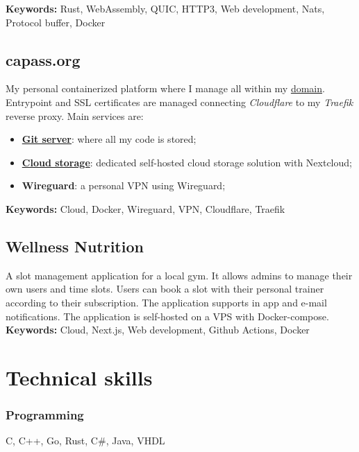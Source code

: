 \documentclass[11pt,a4paper]{article}
\begin{document}
  \textbf{Keywords:} Rust, WebAssembly, QUIC, HTTP3, Web development, Nats, Protocol buffer, Docker 
  
  \subsection{capass.org \href{https://github.com/alarmfox/personal-cloud}{\faGithub} \href{https://git.capass.org}{\faGit} \href{https://cloud.capass.org}{\faCloud}}
  My personal containerized platform where I manage all within my \href{https://capass.org}{domain}. Entrypoint and SSL certificates are managed connecting \textit{Cloudflare} to my \textit{Traefik} reverse proxy. Main services are:
  \begin{itemize}
    \item \href{https://git.capass.org}{\textbf{Git server}}: where all my code is stored;
    \item \href{https://cloud.capass.org}{\textbf{Cloud storage}}: dedicated self-hosted cloud storage solution with Nextcloud;
    \item \textbf{Wireguard}: a personal VPN using Wireguard;
  \end{itemize}
  
  \textbf{Keywords:} Cloud, Docker, Wireguard, VPN, Cloudflare, Traefik

  \subsection{Wellness Nutrition \href{https://github.com/alarmfox/wellness-nutrition}{\faGithub} \href{https://wellnessdemo.capass.org}{\faLaptopCode}}
  A slot management application for a local gym. It allows admins to manage their own users and time slots. Users can book a slot with their personal trainer according to their subscription. The application supports in app and e-mail notifications. The application is self-hosted on a VPS with Docker-compose.\\

  \textbf{Keywords:} Cloud, Next.js, Web development, Github Actions, Docker

  \section{Technical skills}
  \subsubsection{Programming}
  C, C++, Go, Rust, C\#, Java, VHDL
\end{document}
